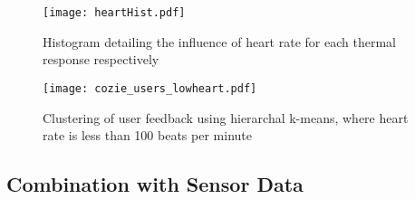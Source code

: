 \begin{figure}
\begin{center}
\texttt{[image: heartHist.pdf]}
\caption{Histogram detailing the influence of heart rate for each thermal response respectively}
\label{fig:heartHist}
\end{center}
\end{figure}

\begin{figure}
\begin{center}
\texttt{[image: cozie\_users\_lowheart.pdf]}
\caption{Clustering of user feedback using hierarchal k-means, where heart rate is less than 100 beats per minute}
\label{fig:lowHeartUsers}
\end{center}
\end{figure}

\subsection{Combination with Sensor Data}